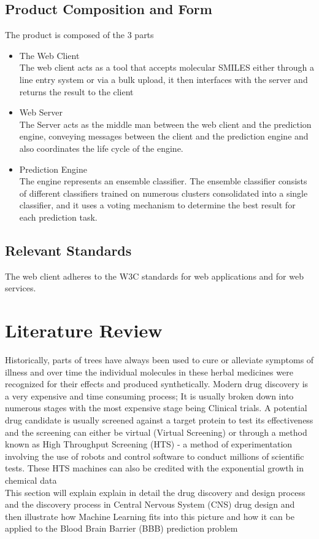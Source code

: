\documentclass[a4paper,12pt]{article}
\begin{document}
		\subsection{Product Composition and Form}
		The product is composed of the 3 parts
			\begin{itemize}
				\item The Web Client \\ The web client acts as a tool that accepts molecular SMILES either through a line entry system or via a bulk upload, it then interfaces with the server and returns the result to the client
				\item Web Server \\ The Server acts as the middle man between the web client and the prediction engine, conveying messages between the client and the prediction engine and also coordinates the life cycle of the engine.
				\item Prediction Engine \\ The engine represents an ensemble classifier. The ensemble classifier consists of different classifiers trained on numerous clusters consolidated into a single classifier, and it uses a voting mechanism to determine the best result for each prediction task.
			\end{itemize}
		\subsection{Relevant Standards}
		The web client adheres to the W3C standards for web applications and for web services.
		
	
	\section{Literature Review}
	Historically, parts of trees have always been used to cure or alleviate symptoms of illness and over time the individual molecules in these herbal medicines were recognized for their effects and produced synthetically. Modern drug discovery is a very expensive and time consuming process; It is usually broken down into numerous stages with the most expensive stage being Clinical trials. A potential drug candidate is usually screened against a target protein to test its effectiveness and the screening can either be virtual (Virtual Screening) or through a method known as High Throughput Screening (HTS) - a method of experimentation involving the use of robots and control software to conduct millions of scientific tests. These HTS machines can also be credited with the exponential growth in chemical data  \cite{Dougetal2008}
	\\
	This section will explain explain in detail the drug discovery and design process and the discovery process in Central Nervous System (CNS) drug design and then illustrate how Machine Learning fits into this picture and how it can be applied to the Blood Brain Barrier (BBB) prediction problem
\end{document}
